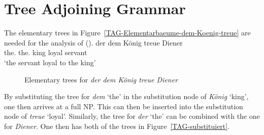 \begin{figure}[H]
\centering
{}
\end{figure}%






\section{Tree Adjoining Grammar}

The elementary trees in Figure~\vref{TAG-Elementarbaeume-dem-Koenig-treue} are needed for the analysis of ().
\ea
\gll der        dem        König treue Diener\\
     the.\nom{} the.\dat{} king  loyal servant\\
\glt `the servant loyal to the king'
\z

\begin{figure}
\hfill
{}
\hfill
{}
\hfill
{}
%
\hfill
%
%
\hfill
%
\hfill\mbox{}
\caption{\label{TAG-Elementarbaeume-dem-Koenig-treue}Elementary trees for \emph{der dem König treue Diener}}
\end{figure}%

\noindent
By substituting the tree for \emph{dem} `the' in the substitution node of \emph{König} `king', one then arrives at a full NP.
This can then be inserted into the substitution node of \emph{treue} `loyal'. Similarly, the tree
for \emph{der} `the' can be combined with the one for \emph{Diener}. One then has both of the trees in Figure~\vref{TAG-substituiert}.

